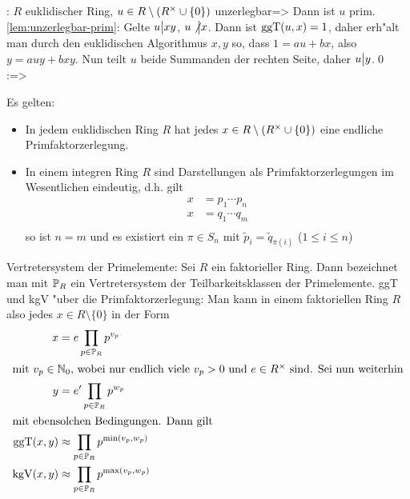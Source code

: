 \lemma:
  $R$ euklidischer Ring, $u\in R\setminus(R^\times\cup\{0\})$ unzerlegbar=>{
  \label{lem:unzerlegbar-prim}
  Dann ist $u$ prim.
  }
\proof \ref{lem:unzerlegbar-prim}:{
  Gelte $u\big| xy$, $u\not\big| x$. Dann ist $\operatorname{ggT}(u,x)=1$, daher
  erh"alt man durch den euklidischen Algorithmus $x,y$ so, dass
  $1=au+bx$, also $y=auy+bxy$. Nun teilt $u$ beide Summanden der rechten Seite,
  daher $u\big| y$.\qed
  }
\theorem:=>{
  Es gelten:
  \begin{itemize}
    \item In jedem euklidischen Ring $R$ hat jedes 
      $x\in R\setminus(R^\times\cup\{0\})$ eine endliche 
      Primfaktorzerlegung.
    \item In einem integren Ring $R$ sind Darstellungen als
      Primfaktorzerlegungen im Wesentlichen eindeutig, d.h. gilt
      \begin{align*}
        x&=p_1\cdots p_n \\
        x&=q_1\cdots q_m \\
        \end{align*}
      so ist $n=m$ und es existiert ein $\pi\in S_n$ mit 
      $\tilde p_i=\tilde q_{\pi(i)}$ ($1\le i\le n$)
    \end{itemize}
  }
 Vertretersystem der Primelemente:{
  Sei $R$ ein faktorieller Ring. Dann bezeichnet man mit $\mathbb P_R$
  ein Vertretersystem der Teilbarkeitsklassen der Primelemente.
  }
\remark ggT und kgV "uber die Primfaktorzerlegung:{
  Man kann in einem faktoriellen Ring $R$ also jedes $x\in R\setminus\{0\}$
  in der Form
  \begin{align*}
    x&=e\prod_{p\in\mathbb P_R} p^{v_p} \\
  \intertext{mit $v_p\in\mathbb N_0$, wobei nur endlich viele $v_p>0$ und 
    $e\in R^\times$ sind. Sei nun weiterhin}
    y&=e'\prod_{p\in\mathbb P_R} p^{w_p} \\
  \intertext{mit ebensolchen Bedingungen. Dann gilt}
    \operatorname{ggT}(x,y)&\approx\prod_{p\in\mathbb P_R} p^{\min(v_p,w_p)} \\
    \operatorname{kgV}(x,y)&\approx\prod_{p\in\mathbb P_R} p^{\max(v_p,w_p)} \\
    \end{align*}
  }
